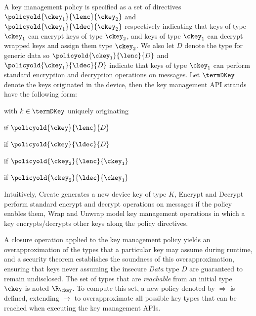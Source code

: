 A key management policy is specified as a set of directives $\policyold{\ckey_1}{\lenc}{\ckey_2}$ and $\policyold{\ckey_1}{\ldec}{\ckey_2}$ respectively indicating that keys of type $\ckey_1$ can encrypt keys of type $\ckey_2$, and keys of type $\ckey_1$ can decrypt wrapped keys and assign them type $\ckey_2$.
We also let $D$ denote the type for generic data so $\policyold{\ckey_1}{\lenc}{D}$ and $\policyold{\ckey_1}{\ldec}{D}$ indicate that keys of type $\ckey_1$ can perform standard encryption and decryption operations on messages.
Let $\termDKey$ denote the keys originated in the device,
then the key management API strands have the following form:
\begin{description}[leftmargin=6em,style=nextline]
\item [~~\rm Create:]  with $k \in \termDKey$ uniquely originating
\item [~~\rm Encrypt:]  if $\policyold{\ckey}{\lenc}{D}$
\item [~~\rm Decrypt:]  if $\policyold{\ckey}{\ldec}{D}$
\item [~~\rm Wrap:]  if $\policyold{\ckey_2}{\lenc}{\ckey_1}$
\item [~~\rm Unwrap:]  if $\policyold{\ckey_2}{\ldec}{\ckey_1}$
\end{description}
Intuitively, Create generates a new device key of type $K$, Encrypt and Decrypt perform standard encrypt and decrypt operations on messages if the policy enables them, Wrap and Unwrap model key management operations in which a key encrypts/decrypts other keys along the policy directives.

A {closure operation} applied to the key management policy yields an overapproximation of the types that a particular key may assume during runtime, and a security theorem establishes the soundness of this overapproximation, ensuring that keys never assuming the insecure \emph{Data} type $D$ are guaranteed to remain undisclosed. The set of types that are \emph{reachable} from an initial type $\ckey$ is noted $\R_\ckey$. To compute this set, a new policy denoted by $\Rightarrow$ is defined, extending $\rightarrow$ to overapproximate all possible key types that can be reached when executing the key management APIs.

